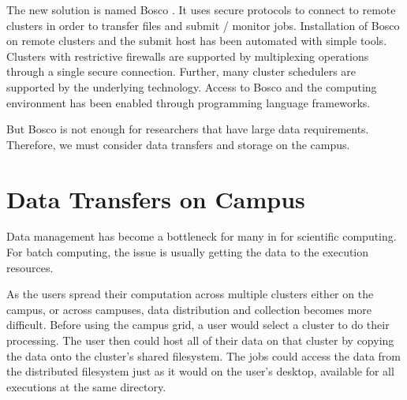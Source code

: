 The new solution is named Bosco \cite{chep2013weitzel}.  It uses secure protocols to connect to remote clusters in order to transfer files and submit / monitor jobs.  Installation of Bosco on remote clusters and the submit host has been automated with simple tools.  Clusters with restrictive firewalls are supported by multiplexing operations through a single secure connection.  Further, many cluster schedulers are supported by the underlying technology.  Access to Bosco and the computing environment has been enabled through programming language frameworks.

But Bosco is not enough for researchers that have large data requirements.  Therefore, we must consider data transfers and storage on the campus.










\section{Data Transfers on Campus}

Data management has become a bottleneck for many in for scientific computing.  For batch computing, the issue is usually getting the data to the execution resources.  

As the users spread their computation across multiple clusters either on the campus, or across campuses, data distribution and collection becomes more difficult.  Before using the campus grid, a user would select a cluster to do their processing.  The user then could host all of their data on that cluster by copying the data onto the cluster's shared filesystem.  The jobs could access the data from the distributed filesystem just as it would on the user's desktop, available for all executions at the same directory.


